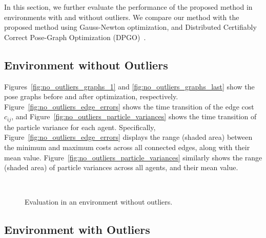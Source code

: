 In this section, we further evaluate the performance of the proposed method in environments with and without outliers.
We compare our method with the proposed method using Gauss-Newton optimization, and Distributed Certifiably Correct Pose-Graph Optimization (DPGO)~\cite{Tian2021}.

\subsection{Environment without Outliers}
\label{subsec:eval_no_outliers}

Figures~\ref{fig:no_outliers_graphs_1} and \ref{fig:no_outliers_graphs_last} show the pose graphs before and after optimization, respectively.
Figure~\ref{fig:no_outliers_edge_errors} shows the time transition of the edge cost $c_{ij}$, and Figure~\ref{fig:no_outliers_particle_variances} shows the time transition of the particle variance for each agent.
Specifically, Figure~\ref{fig:no_outliers_edge_errors} displays the range (shaded area) between the minimum and maximum costs across all connected edges, along with their mean value.
Figure~\ref{fig:no_outliers_particle_variances} similarly shows the range (shaded area) of particle variances across all agents, and their mean value.

\begin{figure}[H]
    \centering
    \hfill
    \\
    \hfill
    \caption{Evaluation in an environment without outliers.}
    \label{fig:eval_no_outliers}
\end{figure}

\subsection{Environment with Outliers}
\label{subsec:eval_with_outliers}

